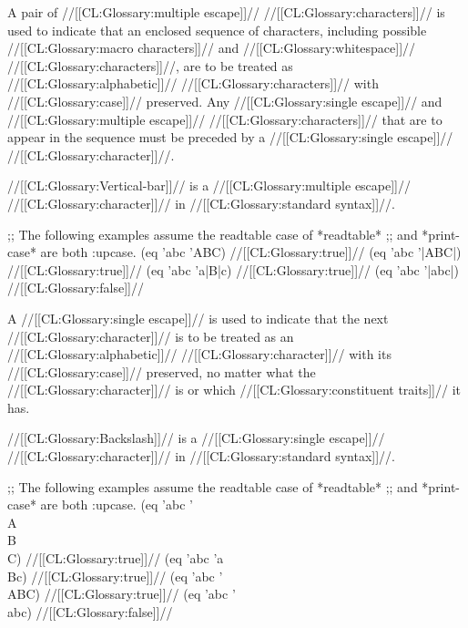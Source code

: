 \endsubsubsection%


A pair of //[[CL:Glossary:multiple escape]]// //[[CL:Glossary:characters]]//
is used to indicate that an enclosed sequence of characters,
including possible //[[CL:Glossary:macro characters]]// and //[[CL:Glossary:whitespace]]// //[[CL:Glossary:characters]]//,
are to be treated as //[[CL:Glossary:alphabetic]]// //[[CL:Glossary:characters]]// 
with //[[CL:Glossary:case]]// preserved.
Any //[[CL:Glossary:single escape]]// and //[[CL:Glossary:multiple escape]]// //[[CL:Glossary:characters]]// 
that are to appear in the sequence must be preceded by a //[[CL:Glossary:single escape]]// 
//[[CL:Glossary:character]]//.  

//[[CL:Glossary:Vertical-bar]]// is a //[[CL:Glossary:multiple escape]]// //[[CL:Glossary:character]]//
in //[[CL:Glossary:standard syntax]]//.


\code
 ;; The following examples assume the readtable case of *readtable* 
 ;; and *print-case* are both :upcase.
 (eq 'abc 'ABC) \EV //[[CL:Glossary:true]]//
 (eq 'abc '|ABC|) \EV //[[CL:Glossary:true]]//
 (eq 'abc 'a|B|c) \EV //[[CL:Glossary:true]]//
 (eq 'abc '|abc|) \EV //[[CL:Glossary:false]]//
\endcode

\endsubsubsubsection%

\endsubsubsection%


A //[[CL:Glossary:single escape]]// is used to indicate that 
the next //[[CL:Glossary:character]]// is to be treated as 
an //[[CL:Glossary:alphabetic]]// //[[CL:Glossary:character]]//
with its //[[CL:Glossary:case]]// preserved,
no matter what the //[[CL:Glossary:character]]// is 
or which //[[CL:Glossary:constituent traits]]// it has.  




//[[CL:Glossary:Backslash]]// is a //[[CL:Glossary:single escape]]// //[[CL:Glossary:character]]// in //[[CL:Glossary:standard syntax]]//.


\code
 ;; The following examples assume the readtable case of *readtable* 
 ;; and *print-case* are both :upcase.
 (eq 'abc '\\A\\B\\C) \EV //[[CL:Glossary:true]]//
 (eq 'abc 'a\\Bc) \EV //[[CL:Glossary:true]]//
 (eq 'abc '\\ABC) \EV //[[CL:Glossary:true]]//
 (eq 'abc '\\abc) \EV //[[CL:Glossary:false]]//
\endcode

